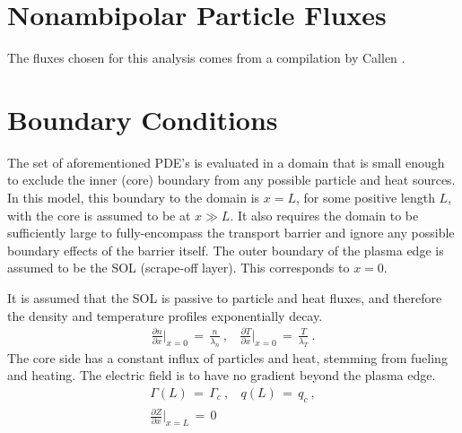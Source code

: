 \section{Nonambipolar Particle Fluxes}\label{sec:nonambipolar_fluxes}
The fluxes chosen for this analysis comes from a compilation by Callen \cite{callen_toroidal_2009}.

\section{Boundary Conditions}\label{sec:boundary_conditions}
The set of aforementioned PDE's is evaluated in a domain that is small enough to exclude the inner (core) boundary from any possible particle and heat sources.
In this model, this boundary to the domain is $x = L$, for some positive length $L$, with the core is assumed to be at $x \gg L$.
It also requires the domain to be sufficiently large to fully-encompass the transport barrier and ignore any possible boundary effects of the barrier itself.
The outer boundary of the plasma edge is assumed to be the SOL (scrape-off layer).
This corresponds to $x = 0$.

It is assumed that the SOL is passive to particle and heat fluxes, and therefore the density and temperature profiles exponentially decay.
\begin{align} %
	\frac{\partial n}{\partial x}\biggr \lvert_{x=0} \,=\, \frac{n}{\lambda_n}~, ~~~~
		\frac{\partial T}{\partial x}\biggr \lvert_{x=0} \,=\, \frac{T}{\lambda_T}~.\label{eq:nT_SOL_boundary}
\end{align}
The core side has a constant influx of particles and heat, stemming from fueling and heating.
The electric field is to have no gradient beyond the plasma edge.
\begin{align} %
	\Gamma(L) \,=\, \Gamma_c~, ~~~~ q(L) \,=\, q_c~,\label{eq:core_fluxes} \\
	\frac{\partial Z}{\partial x}\biggr \lvert_{x=L} \,=\, 0 \label{eq:core_Z_cond}
\end{align}

